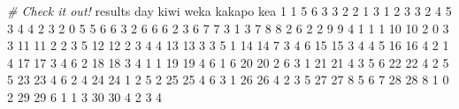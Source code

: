 \documentclass[
]{book}
\newenvironment{Shaded}{\begin{snugshade}}{\end{snugshade}}
\newcommand{\CommentTok}[1]{\textcolor[rgb]{0.56,0.35,0.01}{\textit{#1}}}
\newcommand{\DecValTok}[1]{\textcolor[rgb]{0.00,0.00,0.81}{#1}}
\newcommand{\NormalTok}[1]{#1}
\begin{document}
\begin{Shaded}
\begin{Highlighting}[]
\CommentTok{# Check it out!}
\NormalTok{results}
\NormalTok{   day kiwi weka kakapo kea}
\DecValTok{1}    \DecValTok{1}    \DecValTok{5}    \DecValTok{6}      \DecValTok{3}   \DecValTok{3}
\DecValTok{2}    \DecValTok{2}    \DecValTok{1}    \DecValTok{3}      \DecValTok{1}   \DecValTok{2}
\DecValTok{3}    \DecValTok{3}    \DecValTok{2}    \DecValTok{4}      \DecValTok{5}   \DecValTok{3}
\DecValTok{4}    \DecValTok{4}    \DecValTok{2}    \DecValTok{3}      \DecValTok{2}   \DecValTok{0}
\DecValTok{5}    \DecValTok{5}    \DecValTok{6}    \DecValTok{6}      \DecValTok{3}   \DecValTok{2}
\DecValTok{6}    \DecValTok{6}    \DecValTok{6}    \DecValTok{2}      \DecValTok{3}   \DecValTok{6}
\DecValTok{7}    \DecValTok{7}    \DecValTok{3}    \DecValTok{1}      \DecValTok{3}   \DecValTok{7}
\DecValTok{8}    \DecValTok{8}    \DecValTok{2}    \DecValTok{6}      \DecValTok{2}   \DecValTok{2}
\DecValTok{9}    \DecValTok{9}    \DecValTok{4}    \DecValTok{1}      \DecValTok{1}   \DecValTok{1}
\DecValTok{10}  \DecValTok{10}    \DecValTok{2}    \DecValTok{0}      \DecValTok{3}   \DecValTok{3}
\DecValTok{11}  \DecValTok{11}    \DecValTok{2}    \DecValTok{2}      \DecValTok{3}   \DecValTok{5}
\DecValTok{12}  \DecValTok{12}    \DecValTok{2}    \DecValTok{3}      \DecValTok{4}   \DecValTok{4}
\DecValTok{13}  \DecValTok{13}    \DecValTok{3}    \DecValTok{3}      \DecValTok{5}   \DecValTok{1}
\DecValTok{14}  \DecValTok{14}    \DecValTok{7}    \DecValTok{3}      \DecValTok{4}   \DecValTok{6}
\DecValTok{15}  \DecValTok{15}    \DecValTok{3}    \DecValTok{4}      \DecValTok{4}   \DecValTok{5}
\DecValTok{16}  \DecValTok{16}    \DecValTok{4}    \DecValTok{2}      \DecValTok{1}   \DecValTok{4}
\DecValTok{17}  \DecValTok{17}    \DecValTok{3}    \DecValTok{4}      \DecValTok{6}   \DecValTok{2}
\DecValTok{18}  \DecValTok{18}    \DecValTok{3}    \DecValTok{4}      \DecValTok{1}   \DecValTok{1}
\DecValTok{19}  \DecValTok{19}    \DecValTok{4}    \DecValTok{6}      \DecValTok{1}   \DecValTok{6}
\DecValTok{20}  \DecValTok{20}    \DecValTok{2}    \DecValTok{6}      \DecValTok{3}   \DecValTok{1}
\DecValTok{21}  \DecValTok{21}    \DecValTok{4}    \DecValTok{3}      \DecValTok{5}   \DecValTok{6}
\DecValTok{22}  \DecValTok{22}    \DecValTok{4}    \DecValTok{2}      \DecValTok{5}   \DecValTok{5}
\DecValTok{23}  \DecValTok{23}    \DecValTok{4}    \DecValTok{6}      \DecValTok{2}   \DecValTok{4}
\DecValTok{24}  \DecValTok{24}    \DecValTok{1}    \DecValTok{2}      \DecValTok{5}   \DecValTok{2}
\DecValTok{25}  \DecValTok{25}    \DecValTok{4}    \DecValTok{6}      \DecValTok{3}   \DecValTok{1}
\DecValTok{26}  \DecValTok{26}    \DecValTok{4}    \DecValTok{2}      \DecValTok{3}   \DecValTok{5}
\DecValTok{27}  \DecValTok{27}    \DecValTok{8}    \DecValTok{5}      \DecValTok{6}   \DecValTok{7}
\DecValTok{28}  \DecValTok{28}    \DecValTok{8}    \DecValTok{1}      \DecValTok{0}   \DecValTok{2}
\DecValTok{29}  \DecValTok{29}    \DecValTok{6}    \DecValTok{1}      \DecValTok{1}   \DecValTok{3}
\DecValTok{30}  \DecValTok{30}    \DecValTok{4}    \DecValTok{2}      \DecValTok{3}   \DecValTok{4}
\end{Highlighting}
\end{Shaded}
\end{document}
